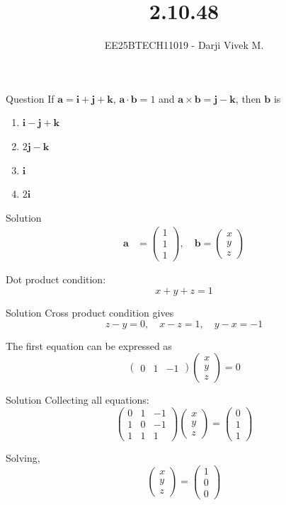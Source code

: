 \documentclass{beamer}
\title{2.10.48}
\author{EE25BTECH11019 - Darji Vivek M.}
\date{}
\newcommand{\myvec}[1]{\begin{pmatrix}#1\end{pmatrix}}
\renewcommand{\vec}[1]{\mathbf{#1}}
\begin{document}
\frame{\titlepage}

\begin{frame}{Question}
If $\vec{a} = \vec{i}+\vec{j}+\vec{k}$, $\vec{a}\cdot\vec{b}=1$ and $\vec{a}\times\vec{b}=\vec{j}-\vec{k}$, then $\vec{b}$ is 
\begin{multicols}{2}
\begin{enumerate}[label=(\alph*)]
\item $\vec{i}-\vec{j}+\vec{k}$  
\item $2\vec{j}-\vec{k}$  
\item $\vec{i}$  
\item $2\vec{i}$  
\end{enumerate}
\end{multicols}
\end{frame}

\begin{frame}{Solution}
\begin{align}
\vec{a} &= \myvec{1\\1\\1}, \quad 
\vec{b} = \myvec{x\\y\\z}
\end{align}

Dot product condition:
\[
x+y+z=1
\]
\end{frame}

\begin{frame}{Solution}
Cross product condition gives
\[
z-y=0,\quad x-z=1,\quad y-x=-1
\]

The first equation can be expressed as
\[
\myvec{0 & 1 & -1}\myvec{x\\y\\z}=0
\]
\end{frame}

\begin{frame}{Solution}
Collecting all equations:
\[
\myvec{0 & 1 & -1\\ 1 & 0 & -1\\ 1 & 1 & 1}\myvec{x\\y\\z}=\myvec{0\\1\\1}
\]

Solving,
\[
\myvec{x\\y\\z}=\myvec{1\\0\\0}
\]
\end{frame}
\end{document}
